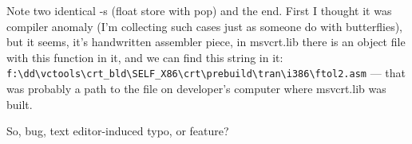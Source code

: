 Note two identical -s (float store with pop) and the end. 
First I thought it was compiler anomaly (I'm collecting such cases just as someone do with butterflies),
but it seems, it's handwritten assembler piece, in msvcrt.lib there is an object file with this function in it,
and we can find this string in it:
\verb|f:\dd\vctools\crt_bld\SELF_X86\crt\prebuild\tran\i386\ftol2.asm| ---
that was probably a path to the file on developer's computer where msvcrt.lib was built.

So, bug, text editor-induced typo, or feature?

